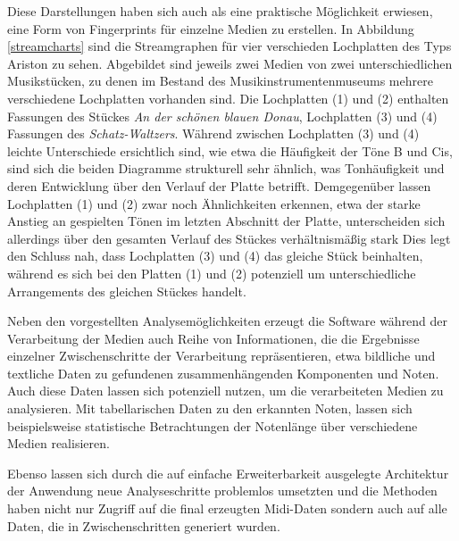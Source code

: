 Diese Darstellungen haben sich auch als eine praktische Möglichkeit erwiesen, eine Form von Fingerprints für einzelne Medien zu erstellen.
In Abbildung \ref{streamcharts} sind die Streamgraphen für vier verschieden Lochplatten des Typs Ariston zu sehen.
Abgebildet sind jeweils zwei Medien von zwei unterschiedlichen Musikstücken, zu denen im Bestand des Musikinstrumentenmuseums mehrere verschiedene Lochplatten vorhanden sind.
Die Lochplatten (1) und (2) enthalten Fassungen des Stückes \textit{An der schönen blauen Donau}, Lochplatten (3) und (4) Fassungen des \textit{Schatz-Waltzers}.
Während zwischen Lochplatten (3) und (4) leichte Unterschiede ersichtlich sind, wie etwa die Häufigkeit der Töne B und Cis, sind sich die beiden Diagramme strukturell sehr ähnlich, was Tonhäufigkeit und deren Entwicklung über den Verlauf der Platte betrifft.
Demgegenüber lassen Lochplatten (1) und (2) zwar noch Ähnlichkeiten erkennen, etwa der starke Anstieg an gespielten Tönen im letzten Abschnitt der Platte, unterscheiden sich allerdings über den gesamten Verlauf des Stückes verhältnismäßig stark
Dies legt den Schluss nah, dass Lochplatten (3) und (4) das gleiche Stück beinhalten, während es sich bei den Platten (1) und (2) potenziell um unterschiedliche Arrangements des gleichen Stückes handelt.

Neben den vorgestellten Analysemöglichkeiten erzeugt die Software während der Verarbeitung der Medien auch Reihe von Informationen, die die Ergebnisse einzelner Zwischenschritte der Verarbeitung repräsentieren, etwa bildliche und textliche Daten zu gefundenen zusammenhängenden Komponenten und Noten.
Auch diese Daten lassen sich potenziell nutzen, um die verarbeiteten Medien zu analysieren.
Mit tabellarischen Daten zu den erkannten Noten, lassen sich beispielsweise statistische Betrachtungen der Notenlänge über verschiedene Medien realisieren.

Ebenso lassen sich durch die auf einfache Erweiterbarkeit ausgelegte Architektur der Anwendung neue Analyseschritte problemlos umsetzten und die Methoden haben nicht nur Zugriff auf die final erzeugten Midi-Daten sondern auch auf alle Daten, die in Zwischenschritten generiert wurden.